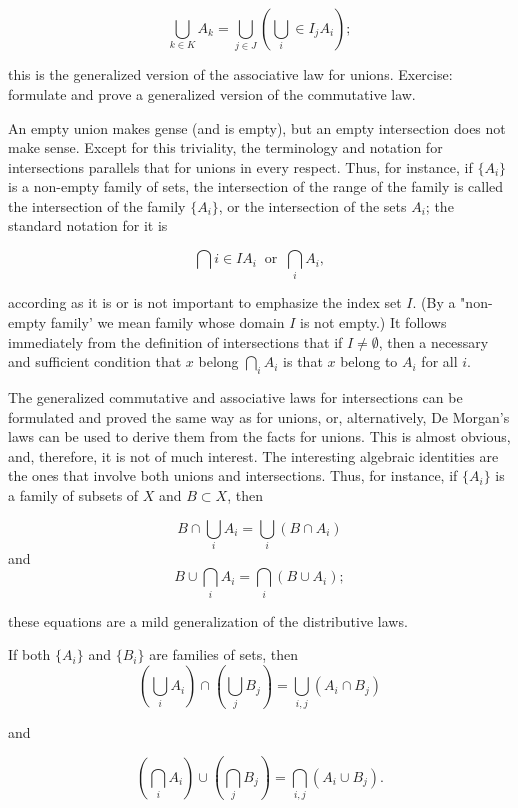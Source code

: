 \begin{equation*}
\bigcup_{k \in K}A_{k} = \bigcup_{j \in J}(\bigcup_{i} \in I_{j}A_{i});
\end{equation*}

this is the generalized version of the associative law for unions. Exercise: formulate and prove a generalized version of the commutative law. 

An empty union makes gense (and is empty), but an empty intersection does not make sense. Except for this triviality, the terminology and notation for intersections parallels that for unions in every respect. Thus, for instance, if $\{ A_{i} \}$ is a non-empty family of sets, the intersection of the range of the family is called the intersection of the family $\{ A_{i} \}$, or the intersection of the sets $A_{i}$; the standard notation for it is 

\begin{equation*}
\bigcap{i \in I}A_{i} \: \text{ or } \: \bigcap_{i}A_{i},
\end{equation*}

according as it is or is not important to emphasize the index set $I$. (By a "non-empty family' we mean family whose domain $I$ is not empty.) It follows immediately from the definition of intersections that if $I \neq \emptyset$, then a necessary and sufficient condition that $x$ belong $\bigcap_{i}A_{i}$ is that $x$ belong to $A_{i}$ for all $i$. 

The generalized commutative and associative laws for intersections can be formulated and proved the same way as for unions, or, alternatively, De Morgan's laws can be used to derive them from the facts for unions. This is almost obvious, and, therefore, it is not of much interest. The interesting algebraic identities are the ones that involve both unions and intersections. Thus, for instance, if $\{ A_{i} \}$ is a family of subsets of $X$ and $B \subset X$, then 

\begin{equation*}
B \cap \bigcup_{i}A_{i} = \bigcup_{i}(B \cap A_{i})
\end{equation*}
and
\begin{equation*}
B \cup \bigcap_{i}A_{i} = \bigcap_{i}(B \cup A_{i});
\end{equation*}

these equations are a mild generalization of the distributive laws.

\begin{exercise} If both $\{ A_{i} \}$ and $\{ B_{i} \}$ are families of sets, then 
\begin{equation*}
(\bigcup_{i}A_{i}) \cap (\bigcup_{j}B_{j}) = \bigcup_{i,j}(A_{i} \cap B_{j}) 
\end{equation*}

and

\begin{equation*}
(\bigcap_{i}A_{i}) \cup (\bigcap_{j}B_{j}) = \bigcap_{i,j}(A_{i} \cup B_{j}). 
\end{equation*}
\end{exercise}

